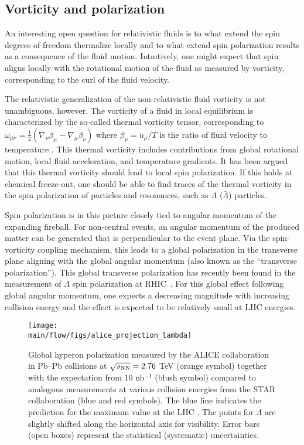 \subsection{Vorticity and polarization}

An interesting open question for relativistic fluids is to what extend the spin degrees of freedom thermalize locally and to what extend spin polarization results as a consequence of the fluid motion. Intuitively, one might expect that spin aligns locally with the rotational motion of the fluid as measured by vorticity, corresponding to the curl of the fluid velocity.

The relativistic generalization of the non-relativistic fluid vorticity is not unambiguous, however. The vorticity of a fluid in local equilibrium is characterized by the so-called thermal vorticity tensor, corresponding to $\omega_{\mu\nu} = \frac{1}{2} (\nabla_\nu \beta_\mu - \nabla_\mu \beta_\nu)$ where $\beta_\mu=u_\mu / T$ is the ratio of fluid velocity to temperature \cite{Becattini:2013fla}. This thermal vorticity includes contributions from global rotational motion, local fluid acceleration, and temperature gradients. It has been argued that this thermal vorticity should lead to local spin polarization. If this holds at chemical freeze-out, one should be able to find traces of the thermal vorticity in the spin polarization of particles and resonances, such as $\Lambda$ ($\bar{\Lambda}$) particles.

Spin polarization is in this picture closely tied to angular momentum of the expanding fireball. For non-central events, an angular momentum of the produced matter can be generated that is perpendicular to the event plane. Via the spin-vorticity coupling mechanism, this leads to a global polarization in the transverse plane aligning with the global angular momentum (also known as the ``transverse polarization''). This global transverse polarization has recently been found in the measurement of $\Lambda$ spin polarization at RHIC~\cite{STAR:2017ckg}. For this global effect following global angular momentum, one expects a decreasing magnitude with increasing collision energy and the effect is expected to be relatively small at LHC energies. 

\begin{figure*}[!htb]
\begin{center}
\texttt{[image: \\main/flow/figs/alice\_projection\_lambda]}
\caption{Global hyperon polarization measured by the ALICE collaboration in Pb--Pb collisions at $\sqrt{s_{\mathrm{NN}}}=2.76$ TeV (orange symbol) together with the expectation from 10 nb$^{-1}$ (blush symbol) compared to analogous measurements at various collision energies from the STAR collaboration \cite{STAR:2017ckg, Abelev:2007zk} (blue and red symbols). The blue line indicates the prediction for the maximum value at the LHC \cite{Voloshin:ICPPA2}. The points for $\overline{\Lambda}$ are slightly shifted along the horizontal axis for visibility.  Error bars (open boxes) represent the statistical (systematic) uncertainties.}
\label{fig:alice_lambda}
\end{center}
\end{figure*}

